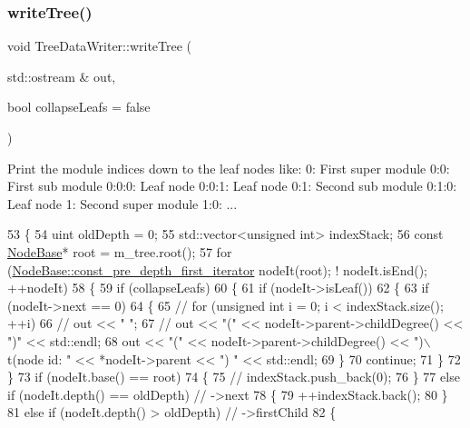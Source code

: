 \subsubsection{\texorpdfstring{write\+Tree()}{writeTree()}}
{\footnotesize\ttfamily void Tree\+Data\+Writer\+::write\+Tree (\begin{DoxyParamCaption}\item[{std\+::ostream \&}]{out,  }\item[{bool}]{collapse\+Leafs = {\ttfamily false} }\end{DoxyParamCaption})}

Print the module indices down to the leaf nodes like\+: 0\+: First super module 0\+:0\+: First sub module 0\+:0\+:0\+: Leaf node 0\+:0\+:1\+: Leaf node 0\+:1\+: Second sub module 0\+:1\+:0\+: Leaf node 1\+: Second super module 1\+:0\+: ... 
\begin{DoxyCode}
53 \{
54     uint oldDepth = 0;
55     std::vector<unsigned int> indexStack;
56     \textcolor{keyword}{const} \mbox{\hyperlink{classNodeBase}{NodeBase}}* root = m\_tree.root();
57     \textcolor{keywordflow}{for} (\mbox{\hyperlink{classDepthFirstIterator}{NodeBase::const\_pre\_depth\_first\_iterator}} nodeIt(root); !
      nodeIt.isEnd(); ++nodeIt)
58     \{
59         \textcolor{keywordflow}{if} (collapseLeafs)
60         \{
61             \textcolor{keywordflow}{if} (nodeIt->isLeaf())
62             \{
63                 \textcolor{keywordflow}{if} (nodeIt->next == 0)
64                 \{
65 \textcolor{comment}{//                  for (unsigned int i = 0; i < indexStack.size(); ++i)}
66 \textcolor{comment}{//                      out << "  ";}
67 \textcolor{comment}{//                  out << "(" << nodeIt->parent->childDegree() << ")" << std::endl;}
68                     out << \textcolor{stringliteral}{"("} << nodeIt->parent->childDegree() << \textcolor{stringliteral}{")\(\backslash\)t(node id: "} << *nodeIt->parent << \textcolor{stringliteral}{")
      "} << std::endl;
69                 \}
70                 \textcolor{keywordflow}{continue};
71             \}
72         \}
73         \textcolor{keywordflow}{if} (nodeIt.base() == root)
74         \{
75 \textcolor{comment}{//          indexStack.push\_back(0);}
76         \}
77         \textcolor{keywordflow}{else} \textcolor{keywordflow}{if} (nodeIt.depth() == oldDepth) \textcolor{comment}{// ->next}
78         \{
79             ++indexStack.back();
80         \}
81         \textcolor{keywordflow}{else} \textcolor{keywordflow}{if} (nodeIt.depth() > oldDepth) \textcolor{comment}{// ->firstChild}
82         \{

\end{DoxyCode}

